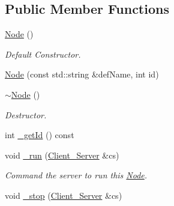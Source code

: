 \subsection*{Public Member Functions}
\begin{DoxyCompactItemize}
\item 
\hypertarget{classColliderPlusPlus_1_1Node_ad7a34779cad45d997bfd6d3d8043c75f}{\hyperlink{classColliderPlusPlus_1_1Node_ad7a34779cad45d997bfd6d3d8043c75f}{Node} ()}\label{classColliderPlusPlus_1_1Node_ad7a34779cad45d997bfd6d3d8043c75f}

\begin{DoxyCompactList}\small\item\em Default Constructor. \end{DoxyCompactList}\item 
\hyperlink{classColliderPlusPlus_1_1Node_a71fb6780106a85088fc3e7f33e5d5e52}{Node} (const std\-::string \&def\-Name, int id)
\item 
\hypertarget{classColliderPlusPlus_1_1Node_aa0840c3cb5c7159be6d992adecd2097c}{\hyperlink{classColliderPlusPlus_1_1Node_aa0840c3cb5c7159be6d992adecd2097c}{$\sim$\-Node} ()}\label{classColliderPlusPlus_1_1Node_aa0840c3cb5c7159be6d992adecd2097c}

\begin{DoxyCompactList}\small\item\em Destructor. \end{DoxyCompactList}\item 
int \hyperlink{classColliderPlusPlus_1_1Node_a261794de64a2198ca94e2c6410f3845f}{\-\_\-get\-Id} () const 
\item 
\hypertarget{classColliderPlusPlus_1_1Node_a5c1390cb98645d55ada8b547a1ecf496}{void \hyperlink{classColliderPlusPlus_1_1Node_a5c1390cb98645d55ada8b547a1ecf496}{\-\_\-run} (\hyperlink{classColliderPlusPlus_1_1Client__Server}{Client\-\_\-\-Server} \&cs)}\label{classColliderPlusPlus_1_1Node_a5c1390cb98645d55ada8b547a1ecf496}

\begin{DoxyCompactList}\small\item\em Command the server to run this \hyperlink{classColliderPlusPlus_1_1Node}{Node}. \end{DoxyCompactList}\item 
\hypertarget{classColliderPlusPlus_1_1Node_a67149c1c5c041254d6d232189d536beb}{void \hyperlink{classColliderPlusPlus_1_1Node_a67149c1c5c041254d6d232189d536beb}{\-\_\-stop} (\hyperlink{classColliderPlusPlus_1_1Client__Server}{Client\-\_\-\-Server} \&cs)}\label{classColliderPlusPlus_1_1Node_a67149c1c5c041254d6d232189d536beb}


\end{DoxyCompactItemize}
